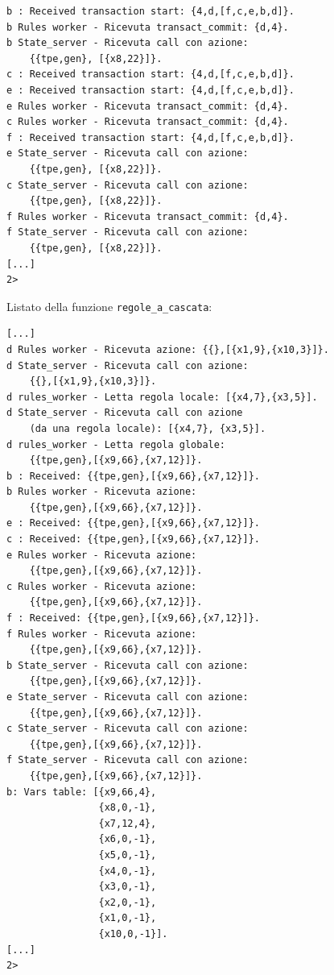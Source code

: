 \documentclass[italian]{memoir}
\begin{document}
\begin{tcolorbox}[colback=yellow!5!white,colframe=cyan!75!black,title=funzione \texttt{transaction} (2)]
\begin{center}
\begin{verbatim}
b : Received transaction start: {4,d,[f,c,e,b,d]}.
b Rules worker - Ricevuta transact_commit: {d,4}.
b State_server - Ricevuta call con azione: 
    {{tpe,gen}, [{x8,22}]}.
c : Received transaction start: {4,d,[f,c,e,b,d]}.
e : Received transaction start: {4,d,[f,c,e,b,d]}.
e Rules worker - Ricevuta transact_commit: {d,4}.
c Rules worker - Ricevuta transact_commit: {d,4}.
f : Received transaction start: {4,d,[f,c,e,b,d]}.
e State_server - Ricevuta call con azione: 
    {{tpe,gen}, [{x8,22}]}.
c State_server - Ricevuta call con azione: 
    {{tpe,gen}, [{x8,22}]}.
f Rules worker - Ricevuta transact_commit: {d,4}.
f State_server - Ricevuta call con azione: 
    {{tpe,gen}, [{x8,22}]}.
[...]
2>
\end{verbatim}
\end{center}
\end{tcolorbox}

Listato della funzione \texttt{regole\_a\_cascata}:
\begin{tcolorbox}[colback=yellow!5!white,colframe=cyan!75!black,title=funzione \texttt{regole\_a\_cascata} (1)]
\begin{center}
\begin{verbatim}
[...]
d Rules worker - Ricevuta azione: {{},[{x1,9},{x10,3}]}.
d State_server - Ricevuta call con azione: 
    {{},[{x1,9},{x10,3}]}.
d rules_worker - Letta regola locale: [{x4,7},{x3,5}].
d State_server - Ricevuta call con azione 
    (da una regola locale): [{x4,7}, {x3,5}].
d rules_worker - Letta regola globale:
    {{tpe,gen},[{x9,66},{x7,12}]}.
b : Received: {{tpe,gen},[{x9,66},{x7,12}]}.
b Rules worker - Ricevuta azione: 
    {{tpe,gen},[{x9,66},{x7,12}]}.
e : Received: {{tpe,gen},[{x9,66},{x7,12}]}.
c : Received: {{tpe,gen},[{x9,66},{x7,12}]}.
e Rules worker - Ricevuta azione: 
    {{tpe,gen},[{x9,66},{x7,12}]}.
c Rules worker - Ricevuta azione: 
    {{tpe,gen},[{x9,66},{x7,12}]}.
f : Received: {{tpe,gen},[{x9,66},{x7,12}]}.
f Rules worker - Ricevuta azione: 
    {{tpe,gen},[{x9,66},{x7,12}]}.
b State_server - Ricevuta call con azione: 
    {{tpe,gen},[{x9,66},{x7,12}]}.
e State_server - Ricevuta call con azione: 
    {{tpe,gen},[{x9,66},{x7,12}]}.
c State_server - Ricevuta call con azione: 
    {{tpe,gen},[{x9,66},{x7,12}]}.
f State_server - Ricevuta call con azione: 
    {{tpe,gen},[{x9,66},{x7,12}]}.
b: Vars table: [{x9,66,4},
                {x8,0,-1},
                {x7,12,4},
                {x6,0,-1},
                {x5,0,-1},
                {x4,0,-1},
                {x3,0,-1},
                {x2,0,-1},
                {x1,0,-1},
                {x10,0,-1}].
[...]
2>
\end{verbatim}
\end{center}
\end{tcolorbox}
\end{document}
